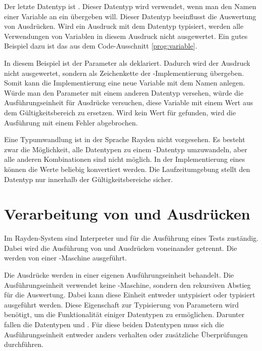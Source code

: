 \SuperPar
Der letzte Datentyp ist . Dieser Datentyp wird verwendet, wenn man den Namen einer Variable an ein  übergeben will. Dieser Datentyp beeinflusst die Auswertung von Ausdrücken. Wird ein Ausdruck mit dem Datentyp  typisiert, werden alle Verwendungen von Variablen in diesem Ausdruck nicht ausgewertet. Ein gutes Beispiel dazu ist das  aus dem Code-Ausschnitt \ref{prog:variable}.

\SuperPar
In diesem Beispiel ist der Parameter  als  deklariert. Dadurch wird der Ausdruck  nicht ausgewertet, sondern als Zeichenkette der -Implementierung übergeben. Somit kann die Implementierung eine neue Variable mit dem Namen  anlegen. Würde man den Parameter  mit einem anderen Datentyp versehen, würde die Ausführungseinheit für Ausdrücke versuchen, diese Variable mit einem Wert aus dem Gültigkeitsbereich zu ersetzen. Wird kein Wert für \enword{} gefunden, wird die Ausführung mit einem Fehler abgebrochen.

\SuperPar
Eine Typumwandlung ist in der Sprache Rayden nicht vorgesehen. Es besteht zwar die Möglichkeit, alle Datentypen zu einem -Datentyp umzuwandeln, aber alle anderen Kombinationen sind nicht möglich. In der Implementierung eines  können die Werte beliebig konvertiert werden. Die Laufzeitumgebung stellt den Datentyp nur innerhalb der Gültigkeitsbereiche sicher.

\section{Verarbeitung von  und Ausdrücken}

Im Rayden-System sind Interpreter und  für die Ausführung eines Tests zuständig. Dabei wird die Ausführung von  und Ausdrücken voneinander getrennt. Die  werden von einer -Maschine ausgeführt. 

\SuperPar
Die Ausdrücke werden in einer eigenen Ausführungseinheit behandelt. Die Ausführungseinheit verwendet keine -Maschine, sondern den rekursiven Abstieg für die Auswertung. Dabei kann diese Einheit entweder untypisiert oder typisiert ausgeführt werden. Diese Eigenschaft zur Typisierung von Parametern wird benötigt, um die Funktionalität einiger Datentypen zu ermöglichen. Darunter fallen die Datentypen  und . Für diese beiden Datentypen muss sich die Ausführungseinheit entweder anders verhalten oder zusätzliche Überprüfungen durchführen. 

